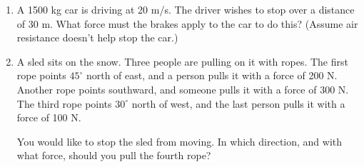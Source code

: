 \documentclass[12pt]{article}
\begin{document}
\begin{enumerate}
 \item{A 1500 kg car is driving at 20 m/s. The driver wishes to stop over a distance of 30 m. What force must the brakes apply to the car to do this? (Assume air resistance doesn't help stop the car.)}
%
%
%
%
%
%
%

\item A sled sits on the snow. Three people are pulling on it with ropes. The first rope points $45^\circ$ north of east, and a person pulls it with a force of 200 N.
Another rope points southward, and someone pulls it with a force of 300 N. The third rope points $30^\circ$ north of west, and the last person pulls it with a force of
100 N.

You would like to stop the sled from moving. In which direction, and with what force, should you pull the fourth rope?


\end{enumerate}
\end{document}
